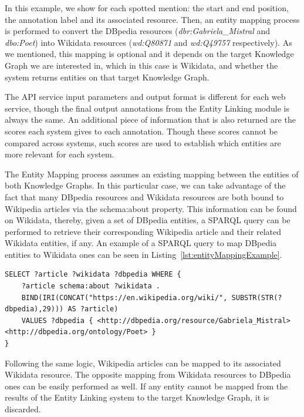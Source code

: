 In this example, we show for each spotted mention: the start and end position, the annotation 
label and its associated resource. Then, an entity mapping process is performed to convert 
the DBpedia resources (\textit{dbr:Gabriela\_Mistral} and \textit{dbo:Poet}) into Wikidata 
resources (\textit{wd:Q80871} and \textit{wd:Q49757} respectively). As we mentioned, this 
mapping is optional and it depends on the target Knowledge Graph we are interested in, which 
in this case is Wikidata, and whether the system returns entities on that target Knowledge 
Graph.

The API service input parameters and output format is different for each web service, though 
the final output annotations from the Entity Linking module is always the same. An additional 
piece of information that is also returned are the scores each system gives to each annotation. 
Though these scores cannot be compared across systems, such scores are used to establish 
which entities are more relevant for each system. 

The Entity Mapping process assumes an existing mapping between the entities of both Knowledge 
Graphs. In this particular case, we can take advantage of the fact that many DBpedia resources 
and Wikidata resources are both bound to Wikipedia articles via the schema:about property. 
This information can be found on Wikidata, thereby, given a set of DBpedia entities, a SPARQL 
query can be performed to retrieve their corresponding Wikipedia article and their related 
Wikidata entities, if any. An example of a SPARQL query to map DBpedia entities to Wikidata 
ones can be seen in Listing~\ref{lst:entityMappingExample}.

\begin{lstlisting}[captionpos=b, 
    caption=SPARQL query example to map DBpedia resources to Wikidata ones., 
    label=lst:entityMappingExample,
    basicstyle=\ttfamily,frame=single]
SELECT ?article ?wikidata ?dbpedia WHERE {
    ?article schema:about ?wikidata .
    BIND(IRI(CONCAT("https://en.wikipedia.org/wiki/", SUBSTR(STR(?dbpedia),29))) AS ?article)
    VALUES ?dbpedia { <http://dbpedia.org/resource/Gabriela_Mistral> <http://dbpedia.org/ontology/Poet> }
}
\end{lstlisting}

Following the same logic, Wikipedia articles can be mapped to its associated Wikidata resource. 
The opposite mapping from Wikidata resources to DBpedia ones can be easily performed as well. 
If any entity cannot be mapped from the results of the Entity Linking system to the target 
Knowledge Graph, it is discarded.

